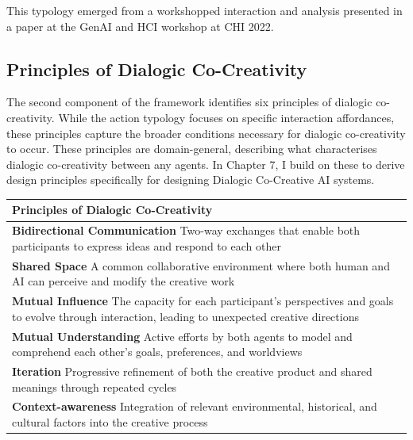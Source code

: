 This typology emerged from a workshopped interaction and analysis presented in a paper at the GenAI and HCI workshop at CHI 2022. 

\subsection{Principles of Dialogic Co-Creativity}

The second component of the framework identifies six principles of dialogic co-creativity. While the action typology focuses on specific interaction affordances, these principles capture the broader conditions necessary for dialogic co-creativity to occur. These principles are domain-general, describing what characterises dialogic co-creativity between any agents. In Chapter 7, I build on these to derive design principles specifically for designing Dialogic Co-Creative AI systems.

\begin{table}[h]
\centering
\small
\renewcommand{\arraystretch}{1.5}
\begin{tabular}{|p{}|}
\hline
\textbf{Principles of Dialogic Co-Creativity}\\ \hline
\textbf{Bidirectional Communication} \newline Two-way exchanges that enable both participants to express ideas and respond to each other \\ \hline
\textbf{Shared Space} \newline A common collaborative environment where both human and AI can perceive and modify the creative work \\ \hline
\textbf{Mutual Influence} \newline The capacity for each participant's perspectives and goals to evolve through interaction, leading to unexpected creative directions \\ \hline
\textbf{Mutual Understanding} \newline Active efforts by both agents to model and comprehend each other's goals, preferences, and worldviews \\ \hline
\textbf{Iteration} \newline Progressive refinement of both the creative product and shared meanings through repeated cycles \\ \hline
\textbf{Context-awareness} \newline Integration of relevant environmental, historical, and cultural factors into the creative process \\ \hline
\end{tabular}
\end{table}


